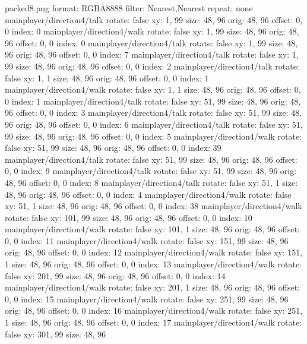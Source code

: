 packed8.png
format: RGBA8888
filter: Nearest,Nearest
repeat: none
mainplayer/direction4/talk
  rotate: false
  xy: 1, 99
  size: 48, 96
  orig: 48, 96
  offset: 0, 0
  index: 0
mainplayer/direction4/walk
  rotate: false
  xy: 1, 99
  size: 48, 96
  orig: 48, 96
  offset: 0, 0
  index: 0
mainplayer/direction4/talk
  rotate: false
  xy: 1, 99
  size: 48, 96
  orig: 48, 96
  offset: 0, 0
  index: 7
mainplayer/direction4/talk
  rotate: false
  xy: 1, 99
  size: 48, 96
  orig: 48, 96
  offset: 0, 0
  index: 2
mainplayer/direction4/talk
  rotate: false
  xy: 1, 1
  size: 48, 96
  orig: 48, 96
  offset: 0, 0
  index: 1
mainplayer/direction4/walk
  rotate: false
  xy: 1, 1
  size: 48, 96
  orig: 48, 96
  offset: 0, 0
  index: 1
mainplayer/direction4/talk
  rotate: false
  xy: 51, 99
  size: 48, 96
  orig: 48, 96
  offset: 0, 0
  index: 3
mainplayer/direction4/talk
  rotate: false
  xy: 51, 99
  size: 48, 96
  orig: 48, 96
  offset: 0, 0
  index: 6
mainplayer/direction4/talk
  rotate: false
  xy: 51, 99
  size: 48, 96
  orig: 48, 96
  offset: 0, 0
  index: 5
mainplayer/direction4/walk
  rotate: false
  xy: 51, 99
  size: 48, 96
  orig: 48, 96
  offset: 0, 0
  index: 39
mainplayer/direction4/talk
  rotate: false
  xy: 51, 99
  size: 48, 96
  orig: 48, 96
  offset: 0, 0
  index: 9
mainplayer/direction4/talk
  rotate: false
  xy: 51, 99
  size: 48, 96
  orig: 48, 96
  offset: 0, 0
  index: 8
mainplayer/direction4/talk
  rotate: false
  xy: 51, 1
  size: 48, 96
  orig: 48, 96
  offset: 0, 0
  index: 4
mainplayer/direction4/walk
  rotate: false
  xy: 51, 1
  size: 48, 96
  orig: 48, 96
  offset: 0, 0
  index: 38
mainplayer/direction4/walk
  rotate: false
  xy: 101, 99
  size: 48, 96
  orig: 48, 96
  offset: 0, 0
  index: 10
mainplayer/direction4/walk
  rotate: false
  xy: 101, 1
  size: 48, 96
  orig: 48, 96
  offset: 0, 0
  index: 11
mainplayer/direction4/walk
  rotate: false
  xy: 151, 99
  size: 48, 96
  orig: 48, 96
  offset: 0, 0
  index: 12
mainplayer/direction4/walk
  rotate: false
  xy: 151, 1
  size: 48, 96
  orig: 48, 96
  offset: 0, 0
  index: 13
mainplayer/direction4/walk
  rotate: false
  xy: 201, 99
  size: 48, 96
  orig: 48, 96
  offset: 0, 0
  index: 14
mainplayer/direction4/walk
  rotate: false
  xy: 201, 1
  size: 48, 96
  orig: 48, 96
  offset: 0, 0
  index: 15
mainplayer/direction4/walk
  rotate: false
  xy: 251, 99
  size: 48, 96
  orig: 48, 96
  offset: 0, 0
  index: 16
mainplayer/direction4/walk
  rotate: false
  xy: 251, 1
  size: 48, 96
  orig: 48, 96
  offset: 0, 0
  index: 17
mainplayer/direction4/walk
  rotate: false
  xy: 301, 99
  size: 48, 96

